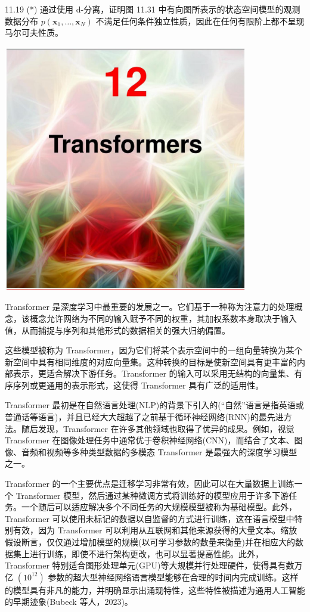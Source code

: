 \documentclass[10pt]{report}
\begin{document}
11.19 (*) 通过使用 d-分离，证明图 11.31 中有向图所表示的状态空间模型的观测数据分布 \(p\left( {{\mathbf{x}}_{1},\ldots ,{\mathbf{x}}_{N}}\right)\) 不满足任何条件独立性质，因此在任何有限阶上都不呈现马尔可夫性质。

\begin{center}
\includegraphics[max width=0.8\textwidth]{images/0194e279-9b28-703a-88f4-c3ac21e2010d_376_474_349_1074_1086_0.jpg}
\end{center}
\hspace*{3em} 

Transformer 是深度学习中最重要的发展之一。它们基于一种称为注意力的处理概念，该概念允许网络为不同的输入赋予不同的权重，其加权系数本身取决于输入值，从而捕捉与序列和其他形式的数据相关的强大归纳偏置。

这些模型被称为 Transformer，因为它们将某个表示空间中的一组向量转换为某个新空间中具有相同维度的对应向量集。这种转换的目标是使新空间具有更丰富的内部表示，更适合解决下游任务。Transformer 的输入可以采用无结构的向量集、有序序列或更通用的表示形式，这使得 Transformer 具有广泛的适用性。

Transformer 最初是在自然语言处理(NLP)的背景下引入的(“自然”语言是指英语或普通话等语言)，并且已经大大超越了之前基于循环神经网络(RNN)的最先进方法。随后发现，Transformer 在许多其他领域也取得了优异的成果。例如，视觉 Transformer 在图像处理任务中通常优于卷积神经网络(CNN)，而结合了文本、图像、音频和视频等多种类型数据的多模态 Transformer 是最强大的深度学习模型之一。

Transformer 的一个主要优点是迁移学习非常有效，因此可以在大量数据上训练一个 Transformer 模型，然后通过某种微调方式将训练好的模型应用于许多下游任务。一个随后可以适应解决多个不同任务的大规模模型被称为基础模型。此外，Transformer 可以使用未标记的数据以自监督的方式进行训练，这在语言模型中特别有效，因为 Transformer 可以利用从互联网和其他来源获得的大量文本。缩放假设断言，仅仅通过增加模型的规模(以可学习参数的数量来衡量)并在相应大的数据集上进行训练，即使不进行架构更改，也可以显著提高性能。此外，Transformer 特别适合图形处理单元(GPU)等大规模并行处理硬件，使得具有数万亿 \(\left( {10}^{12}\right)\) 参数的超大型神经网络语言模型能够在合理的时间内完成训练。这样的模型具有非凡的能力，并明确显示出涌现特性，这些特性被描述为通用人工智能的早期迹象(Bubeck 等人，2023)。
\end{document}
